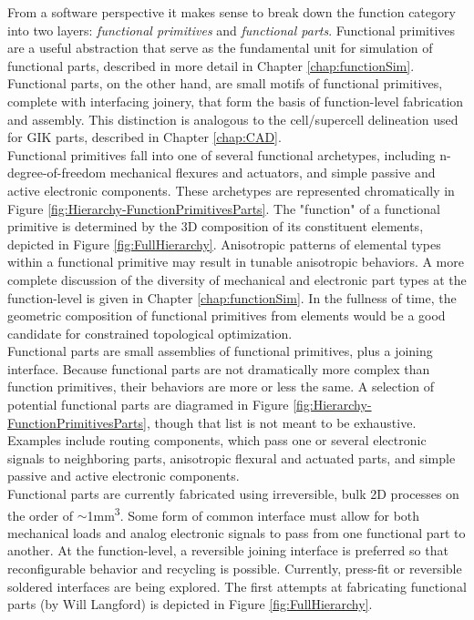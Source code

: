 {From a software perspective it makes sense to break down the function category into two layers: \textit{functional primitives} and \textit{functional parts}.  Functional primitives are a useful abstraction that serve as the fundamental unit for simulation of functional parts, described in more detail in Chapter \ref{chap:functionSim}.  Functional parts, on the other hand, are small motifs of functional primitives, complete with interfacing joinery, that form the basis of function-level fabrication and assembly.  This distinction is analogous to the cell/supercell delineation used for GIK parts, described in Chapter \ref{chap:CAD}.\\

Functional primitives fall into one of several functional archetypes, including n-degree-of-freedom mechanical flexures and actuators, and simple passive and active electronic components.  These archetypes are represented chromatically in Figure \ref{fig:Hierarchy-FunctionPrimitivesParts}.  The "function" of a functional primitive is determined by the 3D composition of its constituent elements, depicted in Figure \ref{fig:FullHierarchy}.  Anisotropic patterns of elemental types within a functional primitive may result in tunable anisotropic behaviors.  A more complete discussion of the diversity of mechanical and electronic part types at the function-level is given in Chapter \ref{chap:functionSim}.  In the fullness of time, the geometric composition of functional primitives from elements would be a good candidate for constrained topological optimization.\\

Functional parts are small assemblies of functional primitives, plus a joining interface.  Because functional parts are not dramatically more complex than function primitives, their behaviors are more or less the same.  A selection of potential functional parts are diagramed in Figure \ref{fig:Hierarchy-FunctionPrimitivesParts}, though that list is not meant to be exhaustive.  Examples include routing components, which pass one or several electronic signals to neighboring parts, anisotropic flexural and actuated parts, and simple passive and active electronic components.\\

Functional parts are currently fabricated using irreversible, bulk 2D processes on the order of $\sim$1mm\textsuperscript{3}.  Some form of common interface must allow for both mechanical loads and analog electronic signals to pass from one functional part to another.  At the function-level, a reversible joining interface is preferred so that reconfigurable behavior and recycling is possible.  Currently, press-fit or reversible soldered interfaces are being explored.  The first attempts at fabricating functional parts (by Will Langford) is depicted in Figure \ref{fig:FullHierarchy}.

}

